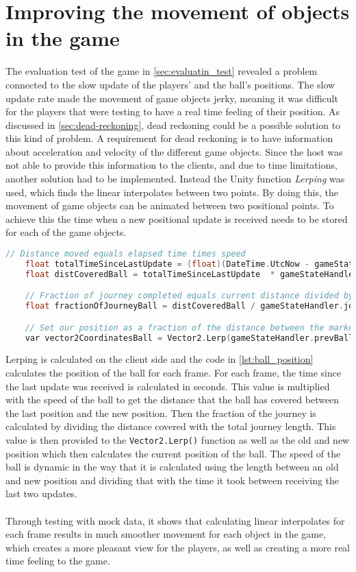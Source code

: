 \section{Improving the movement of objects in the game}
The evaluation test of the game in \autoref{sec:evaluatin_test} revealed a problem connected to the slow update of the players' and the ball's positions.
The slow update rate made the movement of game objects jerky, meaning it was difficult for the players that were testing to have a real time feeling of their position.
As discussed in \autoref{sec:dead-reckoning}, dead reckoning could be a possible solution to this kind of problem.
A requirement for dead reckoning is to have information about acceleration and velocity of the different game objects.
Since the host was not able to provide this information to the clients, and due to time limitations, another solution had to be implemented.
Instead the Unity function \textit{Lerping} was used, which finds the linear interpolates between two points.
By doing this, the movement of game objects can be animated between two positional points.
To achieve this the time when a new positional update is received needs to be stored for each of the game objects.
\begin{lstlisting}[caption={Calculating the position of the ball}, captionpos=b,language=C,label={lst:ball_position}]
    // Distance moved equals elapsed time times speed
    float totalTimeSinceLastUpdate = (float)(DateTime.UtcNow - gameStateHandler.timeAtLastUpdateBall).TotalSeconds;
    float distCoveredBall = totalTimeSinceLastUpdate  * gameStateHandler.ballSpeed;

    // Fraction of journey completed equals current distance divided by total distance.
    float fractionOfJourneyBall = distCoveredBall / gameStateHandler.journeyLengthBall;

    // Set our position as a fraction of the distance between the markers.
    var vector2CoordinatesBall = Vector2.Lerp(gameStateHandler.prevBallPosition, gameStateHandler.newBallPosition, fractionOfJourneyBall);
\end{lstlisting}
Lerping is calculated on the client side and the code in \autoref{lst:ball_position} calculates the position of the ball for each frame.
For each frame, the time since the last update was received is calculated in seconds.
This value is multiplied with the speed of the ball to get the distance that the ball has covered between the last position and the new position.
Then the fraction of the journey is calculated by dividing the distance covered with the total journey length.
This value is then provided to the \texttt{Vector2.Lerp()} function as well as the old and new position which then calculates the current position of the ball.
The speed of the ball is dynamic in the way that it is calculated using the length between an old and new position and dividing that with the time it took between receiving the last two updates.
\\\\
Through testing with mock data, it shows that calculating linear interpolates for each frame results in much smoother movement for each object in the game, which creates a more pleasant view for the players, as well as creating a more real time feeling to the game.